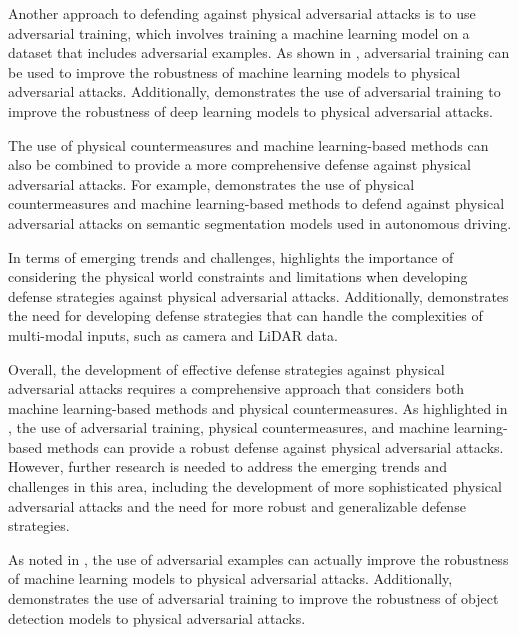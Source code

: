 \documentclass[11pt,a4paper]{article}
\begin{document}
Another approach to defending against physical adversarial attacks is to use adversarial training, which involves training a machine learning model on a dataset that includes adversarial examples. As shown in \cite{arxiv:1803.00404}, adversarial training can be used to improve the robustness of machine learning models to physical adversarial attacks. Additionally, \cite{doi:10.1145/3459637.3482029} demonstrates the use of adversarial training to improve the robustness of deep learning models to physical adversarial attacks.

The use of physical countermeasures and machine learning-based methods can also be combined to provide a more comprehensive defense against physical adversarial attacks. For example, \cite{doi:10.1109/wacv51458.2022.00288} demonstrates the use of physical countermeasures and machine learning-based methods to defend against physical adversarial attacks on semantic segmentation models used in autonomous driving.

In terms of emerging trends and challenges, \cite{doi:10.1007/s11633-019-1211-x} highlights the importance of considering the physical world constraints and limitations when developing defense strategies against physical adversarial attacks. Additionally, \cite{doi:10.1109/iros51168.2021.9636638} demonstrates the need for developing defense strategies that can handle the complexities of multi-modal inputs, such as camera and LiDAR data.

Overall, the development of effective defense strategies against physical adversarial attacks requires a comprehensive approach that considers both machine learning-based methods and physical countermeasures. As highlighted in \cite{doi:10.1145/3702638}, the use of adversarial training, physical countermeasures, and machine learning-based methods can provide a robust defense against physical adversarial attacks. However, further research is needed to address the emerging trends and challenges in this area, including the development of more sophisticated physical adversarial attacks and the need for more robust and generalizable defense strategies.

As noted in \cite{doi:10.1109/cvpr42600.2020.00090}, the use of adversarial examples can actually improve the robustness of machine learning models to physical adversarial attacks. Additionally, \cite{doi:10.1109/iccv.2019.00051} demonstrates the use of adversarial training to improve the robustness of object detection models to physical adversarial attacks.
\end{document}
